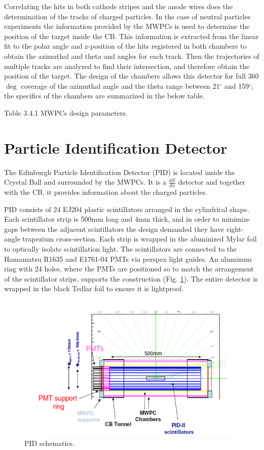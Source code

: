 \indent Correlating  the  hits  in  both  cathode  stripes  and  the  anode  wires  does  the determination of the tracks of charged particles. In the case of neutral particles experiments the information provided by the MWPCs is used to determine the position of the target inside the CB. This information is extracted from the linear fit to the polar angle and z-position of the hits registered in both chambers to obtain the azimuthal and theta and angles for each track. Then the trajectories of multiple tracks are analyzed to find their intersection, and therefore obtain the position of the target. The design of the chambers allows this detector for full 360$\deg$ coverage of the azimuthal angle and the theta range between 21$^{\circ}$ and 159$^{\circ}$; the specifics of the chambers are summarized in the below table.

Table 3.4.1 MWPCs design parameters.

\section{Particle Identification Detector}

\indent The Edinburgh Particle Identification Detector (PID) is located inside the Crystal Ball and surrounded by the MWPCs. It is a $\frac{dE}{dx}$ detector and together with the CB, it provides information about the charged particles.

\indent PID consists of 24 EJ204 plastic scintillators arranged in the cylindrical shape. Each scintillator strip is 500mm long and 4mm thick, and in order to minimize gaps between the adjacent scintillators the design demanded they have right-angle trapezium cross-section. Each strip is wrapped in the aluminized Mylar foil to  optically  isolate  scintillation  light.  The  scintillators  are  connected  to  the Hamamatsu R1635 and E1761-04 PMTs via perspex light guides. An aluminum ring with 24 holes, where the PMTs are positioned so to match the arrangement of  the  scintillator  strips,  supports  the  construction  (Fig. \ref{pid}).  The  entire detector is wrapped in the black Tedlar foil to ensure it is lightproof.

\begin{figure}[H]
\begin{center}
\includegraphics[scale=0.5]{pictures/png/pidschematics.png}
\caption{PID schematics.}
\label{pid}
\end{center}
\end{figure}

